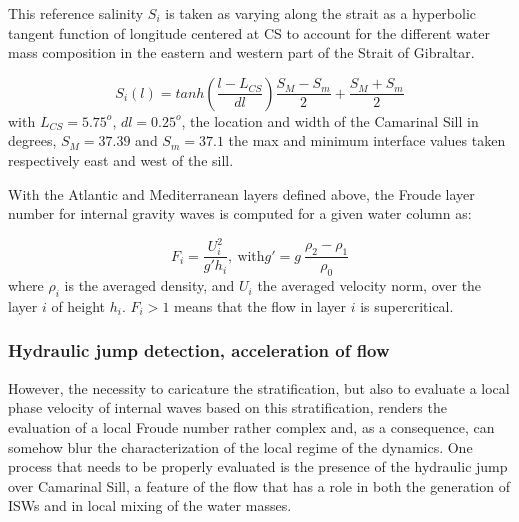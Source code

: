 This reference salinity $S_i$ is taken as varying along the strait as a hyperbolic tangent function of longitude centered at CS to account for the different water mass composition in the eastern and western part of the Strait of Gibraltar. 

\begin{equation}
	S_i(l)=tanh(\frac{l-L_{CS}}{dl})\frac{S_M-S_m}{2}+\frac{S_M+S_m}{2}
	\label{eqSinterface}
\end{equation}
with $L_{CS}=5.75^o$, $dl=0.25^o$, the location and width of the Camarinal Sill in degrees, $S_M=37.39$ and $S_m=37.1$ the max and minimum interface values taken respectively east and west of the sill.

With the Atlantic and Mediterranean layers defined above, the Froude layer number for internal gravity waves is computed for a given water column as: 

\begin{equation}
F_i=\frac{U_i^2}{g'h_i} , \ \text{with} g'=g \ \frac{\rho_2-\rho_1}{\rho_0}
\end{equation}
where $\rho_i$ is the averaged density, and  $U_i$ the averaged velocity norm, over the layer $i$ of height $h_i$. $F_i>1$ means that the flow in layer $i$ is supercritical.


\subsubsection{Hydraulic jump detection, acceleration of flow}
\label{sectiondiagJump}
However, the necessity to caricature the stratification, but also to evaluate a local phase velocity of internal waves based on this stratification, renders the evaluation of a local Froude number rather complex and, as a consequence, can somehow blur the characterization of the local regime of the dynamics. One process that needs to be properly evaluated is the presence of the hydraulic jump over Camarinal Sill, a feature of the flow that has a role in both the generation of ISWs and in local mixing of the water masses.


